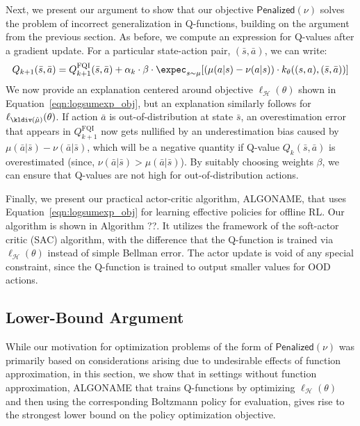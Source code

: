 Next, we present our argument to show that our objective $\mathsf{Penalized}(\nu)$ solves the problem of incorrect generalization
in Q-functions, building on the argument from the previous section. As before, we compute an expression for Q-values after a gradient update.
For a particular state-action pair, $(\bar{s}, \bar{a})$, we can write:
\begin{equation}
\label{eqn:new_kernelized_update}
    Q_{k+1}(\bar{s}, \bar{a}) = Q_{k+1}^{\text{FQI}}(\bar{s}, \bar{a}) + \alpha_k \cdot \beta \cdot \expec_{s \sim \mu} [(\mu(a|s) - \nu(a|s)) \cdot k_\theta((s, a), (\bar{s}, \bar{a}))]
\end{equation}
We now provide an explanation centered around objective $\ell_\mathcal{H}(\theta)$ shown in Equation~\ref{eqn:logsumexp_obj}, but an explanation similarly follows for $\ell_{\mathcal{\kldiv(\hat{\mu})}}(\theta)$. If action $\bar{a}$ is out-of-distribution at state $\bar{s}$, an overestimation error that appears in $Q_{k+1}^{\text{FQI}}$ now gets nullified by an underestimation bias caused by $\mu(\bar{a}|\bar{s}) - \nu(\bar{a}|\bar{s})$, which will be a negative quantity if Q-value $Q_k(\bar{s}, \bar{a})$ is overestimated (since, $\nu(\bar{a}|\bar{s}) > \mu(\bar{a}|\bar{s})$). By suitably choosing weights $\beta$, we can ensure that Q-values are not high
for out-of-distribution actions. 


Finally, we present our practical actor-critic algorithm, ALGONAME, that uses Equation~\ref{eqn:logsumexp_obj} for learning effective policies for offline RL. Our algorithm is shown in Algorithm ??. It utilizes the framework of the soft-actor critic (SAC) algorithm, with the difference that the Q-function is trained via $\ell_\mathcal{H}(\theta)$ instead of simple Bellman error. The actor update is void of any special constraint, since the Q-function is trained to output smaller values for OOD actions.    


\subsection{Lower-Bound Argument}
While our motivation for optimization problems of the form of $\mathsf{Penalized}(\nu)$ was primarily based on considerations arising due to undesirable effects of function approximation,
in this section, we show that in settings without function approximation, ALGONAME that trains
Q-functions by optimizing $\ell_\mathcal{H}(\theta)$ and then using the corresponding Boltzmann policy for evaluation, gives rise to the strongest lower bound on the policy optimization objective.

